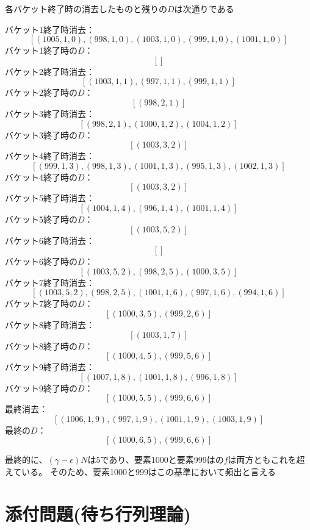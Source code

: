 \documentclass{report}
\begin{document}
\begin{CJK}{UTF8}{min}
    各バケット終了時の消去したものと残りの$D$は次通りである

    バケット1終了時消去：
    \[ [(1005, 1, 0), (998, 1, 0), (1003, 1, 0), (999, 1, 0), (1001, 1, 0)] \]
    バケット1終了時の$D$：
    \[ [] \]
    バケット2終了時消去：
    \[ [(1003, 1, 1), (997, 1, 1), (999, 1, 1)] \]
    バケット2終了時の$D$：
    \[ [(998, 2, 1)] \]
    バケット3終了時消去：
    \[ [(998, 2, 1), (1000, 1, 2), (1004, 1, 2)] \]
    バケット3終了時の$D$：
    \[ [(1003, 3, 2)] \]
    バケット4終了時消去：
    \[ [(999, 1, 3), (998, 1, 3), (1001, 1, 3), (995, 1, 3), (1002, 1, 3)] \]
    バケット4終了時の$D$：
    \[ [(1003, 3, 2)] \]
    バケット5終了時消去：
    \[ [(1004, 1, 4), (996, 1, 4), (1001, 1, 4)] \]
    バケット5終了時の$D$：
    \[ [(1003, 5, 2)] \]
    バケット6終了時消去：
    \[ [] \]
    バケット6終了時の$D$：
    \[ [(1003, 5, 2), (998, 2, 5), (1000, 3, 5)] \]
    バケット7終了時消去：
    \[ [(1003, 5, 2), (998, 2, 5), (1001, 1, 6), (997, 1, 6), (994, 1, 6)] \]
    バケット7終了時の$D$：
    \[ [(1000, 3, 5), (999, 2, 6)] \]
    バケット8終了時消去：
    \[ [(1003, 1, 7)] \]
    バケット8終了時の$D$：
    \[ [(1000, 4, 5), (999, 5, 6)] \]
    バケット9終了時消去：
    \[ [(1007, 1, 8), (1001, 1, 8), (996, 1, 8)] \]
    バケット9終了時の$D$：
    \[ [(1000, 5, 5), (999, 6, 6)] \]
    最終消去：
    \[ [(1006, 1, 9), (997, 1, 9), (1001, 1, 9), (1003, 1, 9)] \]
    最終の$D$：
    \[ [(1000, 6, 5), (999, 6, 6)] \]

    最終的に、$(\gamma-\epsilon)N$は$5$であり、要素1000と要素999はの$f$は両方ともこれを超えている。
    そのため、要素1000と999はこの基準において頻出と言える
    \clearpage
    \section*{添付問題(待ち行列理論)}

\end{CJK}
\end{document}
